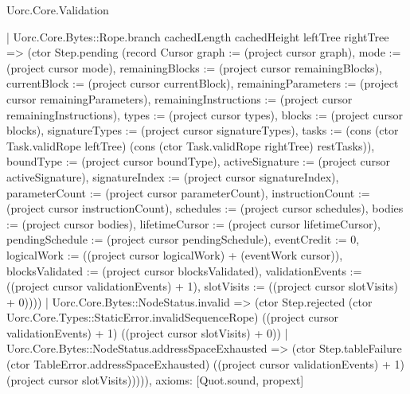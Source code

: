 \begin{lexlean}{Uorc.Core.Validation}
\begin{semanticmodule}
{          | Uorc.Core.Bytes::Rope.branch cachedLength cachedHeight leftTree rightTree => (ctor Step.pending (record Cursor {graph := (project cursor graph), mode := (project cursor mode), remainingBlocks := (project cursor remainingBlocks), currentBlock := (project cursor currentBlock), remainingParameters := (project cursor remainingParameters), remainingInstructions := (project cursor remainingInstructions), types := (project cursor types), blocks := (project cursor blocks), signatureTypes := (project cursor signatureTypes), tasks := (cons (ctor Task.validRope leftTree) (cons (ctor Task.validRope rightTree) restTasks)), boundType := (project cursor boundType), activeSignature := (project cursor activeSignature), signatureIndex := (project cursor signatureIndex), parameterCount := (project cursor parameterCount), instructionCount := (project cursor instructionCount), schedules := (project cursor schedules), bodies := (project cursor bodies), lifetimeCursor := (project cursor lifetimeCursor), pendingSchedule := (project cursor pendingSchedule), eventCredit := 0, logicalWork := ((project cursor logicalWork) + (eventWork cursor)), blocksValidated := (project cursor blocksValidated), validationEvents := ((project cursor validationEvents) + 1), slotVisits := ((project cursor slotVisits) + 0)})))
        | Uorc.Core.Bytes::NodeStatus.invalid => (ctor Step.rejected (ctor Uorc.Core.Types::StaticError.invalidSequenceRope) ((project cursor validationEvents) + 1) ((project cursor slotVisits) + 0))
        | Uorc.Core.Bytes::NodeStatus.addressSpaceExhausted => (ctor Step.tableFailure (ctor TableError.addressSpaceExhausted) ((project cursor validationEvents) + 1) (project cursor slotVisits))))),
  axioms: [Quot.sound, propext]
}


\end{semanticmodule}
\end{lexlean}
